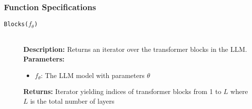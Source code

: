 \subsubsection{Function Specifications}
\begin{description}
\item[\texttt{Blocks($f_\theta$)}] \hfill \\
\textbf{Description:} Returns an iterator over the transformer blocks in the LLM. \\
\textbf{Parameters:}
\begin{itemize}
\item $f_\theta$: The LLM model with parameters $\theta$
\end{itemize}
\textbf{Returns:} Iterator yielding indices of transformer blocks from 1 to $L$ where $L$ is the total number of layers


\end{description}
